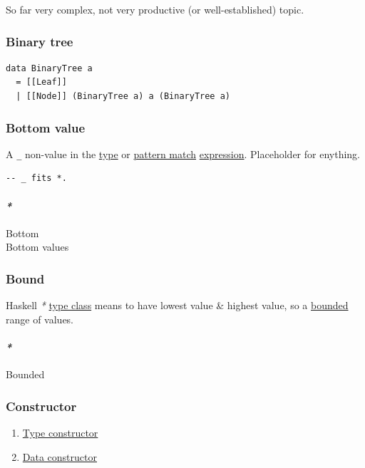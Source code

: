 \documentclass[11pt]{article}
\begin{document}
So far very complex, not very productive (or well-established) topic.\\

\subsubsection{\label{org9462831}Binary tree}
\label{sec:orgb86c025}
\begin{verbatim}
data BinaryTree a
  = [[Leaf]]
  | [[Node]] (BinaryTree a) a (BinaryTree a)
\end{verbatim}

\subsubsection{\label{org7a3a93b}Bottom value}
\label{sec:org59eaf9b}
A \texttt{\_} non-value in the \hyperref[orgc4aea2f]{type} or \hyperref[org8d84a1a]{pattern match} \hyperref[org9021dd7]{expression}. Placeholder for enything.\\

\begin{verbatim}
-- _ fits *.
\end{verbatim}

\paragraph{\emph{*}}
\label{sec:org7a3f356}

\label{orgfc88662}Bottom\\
\label{org46550b8}Bottom values\\

\subsubsection{\label{orgaac83d9}Bound}
\label{sec:orgdb92300}
Haskell \emph{*} \hyperref[org16d8a26]{type class} means to have lowest value \& highest value, so a \hyperref[org8ac09e1]{bounded} range of values.\\

\paragraph{\emph{*}}
\label{sec:orgae81ea0}

\label{org8ac09e1}Bounded\\

\subsubsection{\label{orgf4d811d}Constructor}
\label{sec:orgb5c7db3}
\begin{enumerate}
\item \hyperref[org385fa30]{Type constructor}\\
\item \hyperref[org1fbdcfd]{Data constructor}\\
\end{enumerate}
\end{document}
